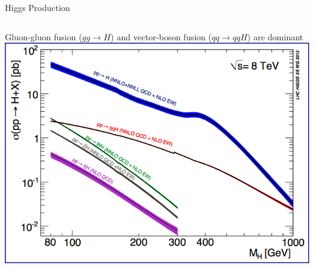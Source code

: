 \begin{frame}{Higgs Production}
\begin{center}
\begin{columns}
  \begin{column}{0.65\textwidth}
    Gluon-gluon fusion ($gg \rightarrow H$) and vector-boson fusion ($qq \rightarrow qqH$) are dominant
    \includegraphics[width=0.99\textwidth]{images/higgs_production_lhc.png}
  \end{column}
\end{columns}
\end{center}
\end{frame}








